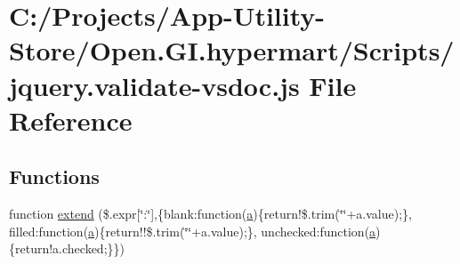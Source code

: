 \hypertarget{jquery_8validate-vsdoc_8js}{}\section{C\+:/\+Projects/\+App-\/\+Utility-\/\+Store/\+Open.G\+I.\+hypermart/\+Scripts/jquery.validate-\/vsdoc.js File Reference}
\label{jquery_8validate-vsdoc_8js}
\subsection*{Functions}
\begin{DoxyCompactItemize}
\item 
function \hyperlink{jquery_8validate-vsdoc_8js_a08553879d4a764e75170d547d37bd35f}{extend} (\$.expr\mbox{[}\char`\"{}\+:\char`\"{}\mbox{]},\{blank\+:function(\hyperlink{_scripts_2bootstrap_8min_8js_a7318f59fb86a4437995ee89c780c51ac}{a})\{return!\$.\+trim(\char`\"{}\char`\"{}+a.\+value);\}, filled\+:function(\hyperlink{_scripts_2bootstrap_8min_8js_a7318f59fb86a4437995ee89c780c51ac}{a})\{return!!\$.\+trim(\char`\"{}\char`\"{}+a.\+value);\}, unchecked\+:function(\hyperlink{_scripts_2bootstrap_8min_8js_a7318f59fb86a4437995ee89c780c51ac}{a})\{return!a.\+checked;\}\})
\item 

\end{DoxyCompactItemize}
